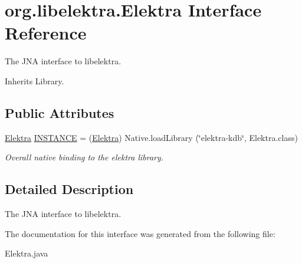 \hypertarget{interfaceorg_1_1libelektra_1_1Elektra}{}\section{org.\+libelektra.\+Elektra Interface Reference}
\label{interfaceorg_1_1libelektra_1_1Elektra}


The J\+NA interface to libelektra.  




Inherits Library.

\subsection*{Public Attributes}
\begin{DoxyCompactItemize}
\item 
\mbox{\label{interfaceorg_1_1libelektra_1_1Elektra_a5a69a68a26ccec272c0f992f0a94a4cc}} 
\hyperlink{interfaceorg_1_1libelektra_1_1Elektra}{Elektra} \hyperlink{interfaceorg_1_1libelektra_1_1Elektra_a5a69a68a26ccec272c0f992f0a94a4cc}{I\+N\+S\+T\+A\+N\+CE} = (\hyperlink{interfaceorg_1_1libelektra_1_1Elektra}{Elektra}) Native.\+load\+Library (\char`\"{}elektra-\/kdb\char`\"{}, Elektra.\+class)
\begin{DoxyCompactList}\small\item\em Overall native binding to the elektra library. \end{DoxyCompactList}\end{DoxyCompactItemize}


\subsection{Detailed Description}
The J\+NA interface to libelektra. 

The documentation for this interface was generated from the following file\+:\begin{DoxyCompactItemize}
\item 
Elektra.\+java\end{DoxyCompactItemize}
